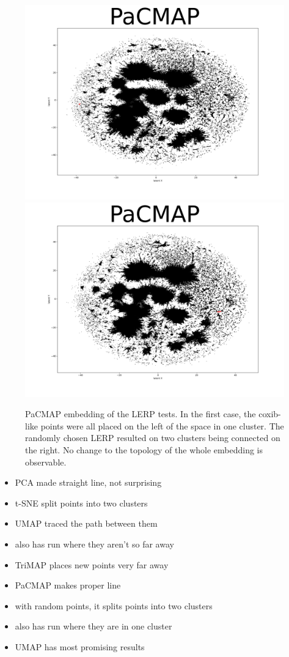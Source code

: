 \begin{figure}[h]
	\centering
	\includegraphics[width=0.7\columnwidth]{figures/PaCMAP_LERP_coxib}
	\includegraphics[width=0.7\columnwidth]{figures/PaCMAP_LERP_random}
	\caption{PaCMAP embedding of the LERP tests. In the first case, the coxib-like points were all placed on the left of the space in one cluster. The randomly chosen LERP resulted on two clusters being connected on the right. No change to the topology of the whole embedding is observable.}
	\label{fig:pacmap:lerp}
\end{figure}


\begin{itemize}
	\item PCA made straight line, not surprising
	\item t-SNE split points into two clusters
	\item UMAP traced the path between them
	\item also has run where they aren't so far away
	\item TriMAP places new points very far away
	\item PaCMAP makes proper line
	\item with random points, it splits points into two clusters
	\item also has run where they are in one cluster
	\item UMAP has most promising results
\end{itemize}



